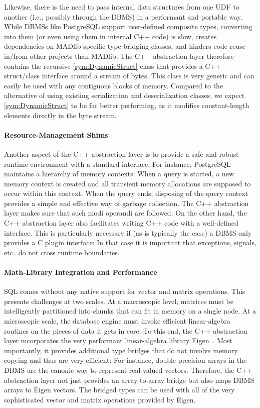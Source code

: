 Likewise, there is the need to pass internal data structures from one UDF to another (i.e., possibly through the DBMS) in a performant and portable way. While DBMSs like PostgreSQL support user-defined composite types, converting into them (or even using them in internal C++ code) is slow, creates dependencies on MADlib-specific type-bridging classes, and hinders code reuse in/from other projects than MADlib. The C++ abstraction layer therefore contains the recursive \ref{sym:DynamicStruct} class that provides a C++ struct/class interface around a stream of bytes. This class is very generic and can easily be used with any contiguous blocks of memory. Compared to the alternative of using existing serialization and deserialization classes, we expect \ref{sym:DynamicStruct} to be far better performing, as it modifies constant-length elements directly in the byte stream.

\paragraph{Resource-Management Shims}

Another aspect of the C++ abstraction layer is to provide a safe and robust runtime environment with a standard interface. For instance, PostgreSQL maintains a hierarchy of memory contexts: When a query is started, a new memory context is created and all transient memory allocations are supposed to occur within this context. When the query ends, disposing of the query context provides a simple and effective way of garbage collection. The C++ abstraction layer makes sure that such modi operandi are followed. On the other hand, the C++ abstraction layer also facilitates writing C++ code with a well-defined interface. This is particularly necessary if (as is typically the case) a DBMS only provides a C plugin interface: In that case it is important that exceptions, signals, etc.\ do not cross runtime boundaries.

\paragraph{Math-Library Integration and Performance}

SQL comes without any native support for vector and matrix operations. This presents challenges at two scales. At a macroscopic level, matrices must be intelligently partitioned into chunks that can fit in memory on a single node. At a microscopic scale, the database engine must invoke efficient linear-algebra routines on the pieces of data it gets in core. To this end, the C++ abstraction layer incorporates the very performant linear-algebra library Eigen~\cite{eigen}. Most importantly, it provides additional type bridges that do not involve memory copying and thus are very efficient: For instance, double-precision arrays in the DBMS are the canonic way to represent real-valued vectors. Therefore, the C++ abstraction layer not just provides an array-to-array bridge but also maps DBMS arrays to Eigen vectors. The bridged types can be used with all of the very sophisticated vector and matrix operations provided by Eigen.

